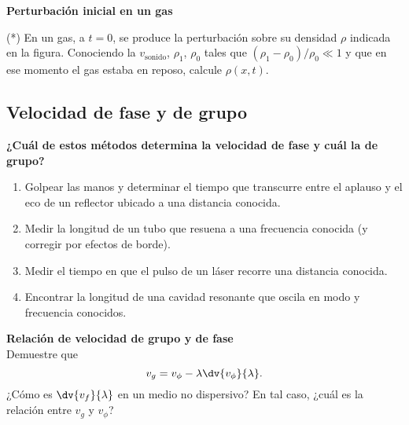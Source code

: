 \item 
\textbf{Perturbación inicial en un gas}\\
\begin{minipage}[t][1.5cm]{0.7\textwidth}
(*) En un gas, a $t=0$, se produce la perturbación sobre su densidad \(\rho\) indicada en la figura.
Conociendo la $v_\text{sonido}$, $\rho_{1}$, $\rho_{0}$ tales que $(\rho_{1}-\rho_{0})/\rho_{0}\ll1$ y que en ese momento el gas estaba en reposo, calcule $\rho(x,t)$.
\end{minipage}
\begin{minipage}[c][1.6cm][t]{0.2\textwidth}
\end{minipage}





\subsection*{Velocidad de fase y de grupo}

\item
\textbf{
¿Cuál de estos métodos determina la velocidad de fase y cuál la de grupo?}
\begin{enumerate}
\item Golpear las manos y determinar el tiempo que transcurre entre el aplauso y el eco de un reflector ubicado a una distancia conocida.
\item Medir la longitud de un tubo que resuena a una frecuencia conocida (y corregir por efectos de borde).
\item Medir el tiempo en que el pulso de un láser recorre una distancia conocida.
\item Encontrar la longitud de una cavidad resonante que oscila en modo y frecuencia conocidos.
\end{enumerate}



\item 
\textbf{Relación de velocidad de grupo y de fase}\\
Demuestre que
$$
v_g = v_\phi - \lambda \dv{v_\phi}{\lambda}.
$$
¿Cómo es $\dv{v_f}{\lambda}$ en un medio no dispersivo?
En tal caso, ¿cuál es la relación entre $v_g$ y $v_\phi$?
